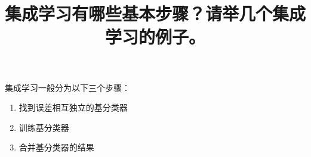 \documentclass{article}
\title{集成学习有哪些基本步骤？请举几个集成学习的例子。}
\begin{document}
\maketitle

集成学习一般分为以下三个步骤：
\begin{enumerate}
    \item 找到误差相互独立的基分类器
    \item 训练基分类器
    \item 合并基分类器的结果
\end{enumerate}
\end{document}

